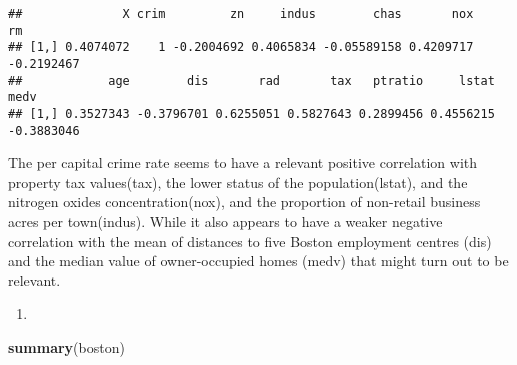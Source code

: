 \documentclass[
]{article}
\newenvironment{Shaded}{\begin{snugshade}}{\end{snugshade}}
\newcommand{\FunctionTok}[1]{\textcolor[rgb]{0.13,0.29,0.53}{\textbf{#1}}}
\newcommand{\NormalTok}[1]{#1}
\providecommand{\tightlist}{%
  \setlength{\itemsep}{0pt}\setlength{\parskip}{0pt}}
\begin{document}
\begin{verbatim}
##              X crim         zn     indus        chas       nox         rm
## [1,] 0.4074072    1 -0.2004692 0.4065834 -0.05589158 0.4209717 -0.2192467
##            age        dis       rad       tax   ptratio     lstat       medv
## [1,] 0.3527343 -0.3796701 0.6255051 0.5827643 0.2899456 0.4556215 -0.3883046
\end{verbatim}

The per capital crime rate seems to have a relevant positive correlation
with property tax values(tax), the lower status of the
population(lstat), and the nitrogen oxides concentration(nox), and the
proportion of non-retail business acres per town(indus). While it also
appears to have a weaker negative correlation with the mean of distances
to five Boston employment centres (dis) and the median value of
owner-occupied homes (medv) that might turn out to be relevant.

\begin{enumerate}
\def\labelenumi{(\alph{enumi})}
\setcounter{enumi}{3}
\tightlist
\item
\end{enumerate}

\begin{Shaded}
\begin{Highlighting}[]
\FunctionTok{summary}\NormalTok{(boston)}
\end{Highlighting}
\end{Shaded}
\end{document}
